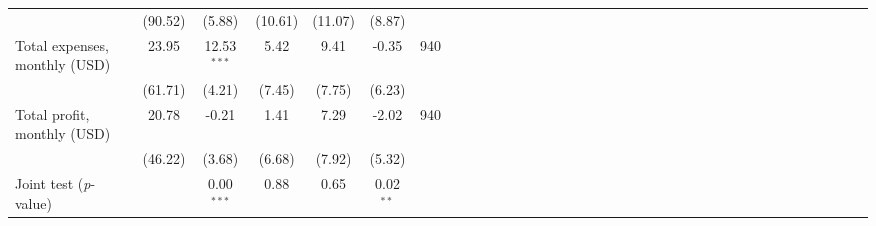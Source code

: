 {\begin{tabular}{l*{6}{SSSSSc}}
          &  (90.52)&   (5.88)&  (10.61)&  (11.07)&   (8.87)&         \\
Total expenses, monthly (USD)&    23.95&12.53$^{***}$&     5.42&     9.41&    -0.35&      940\\
          &  (61.71)&   (4.21)&   (7.45)&   (7.75)&   (6.23)&         \\
Total profit, monthly (USD)&    20.78&    -0.21&     1.41&     7.29&    -2.02&      940\\
          &  (46.22)&   (3.68)&   (6.68)&   (7.92)&   (5.32)&         \\
\midrule Joint test (\emph{p}-value)&         &0.00$^{***}$&     0.88&     0.65&0.02$^{**}$&         \\
\bottomrule
\end{tabular}
}
